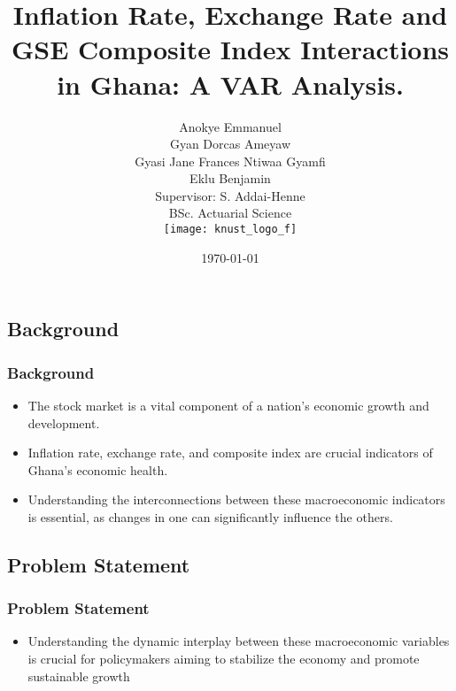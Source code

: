 \documentclass[12pt]{beamer}
\title[ KNUST]{\textbf{\small{Inflation Rate, Exchange Rate and GSE Composite Index Interactions in Ghana: A VAR Analysis.}}}
\author[BSc. Actuarial Science]{{\footnotesize{Anokye Emmanuel\\Gyan Dorcas Ameyaw \\ Gyasi Jane Frances Ntiwaa Gyamfi\\ Eklu Benjamin\\ \vspace{0.2cm}Supervisor: S. Addai-Henne }}\vspace{0.2cm} \\ BSc. Actuarial Science\\[5mm] \texttt{[image: knust\_logo\_f]}}
\institute[COS]{ Kwame Nkrumah University Of Science And Technology, KNUST \\ Kumasi, Ghana}
\date[\tiny \today]{\scriptsize \today}
\begin{document}

	\begin{frame}[plain]
		\maketitle
	\end{frame}
	
	
	

	\begin{frame}
		\section{Background} 
		\frametitle{Background}
		\begin{flushleft}
				\begin{itemize}
		
				
		
\item The stock market is a vital component of a nation's economic growth and development.
\vspace{0.3cm}
\item Inflation rate, exchange rate, and composite index are crucial indicators of Ghana's economic health.
\vspace{0.3cm}
\item Understanding the interconnections between these macroeconomic indicators is essential, as changes in one can significantly influence the others.
	\end{itemize}
		\end{flushleft}	
	\end{frame}

	
	\begin{frame}
		\section{Problem Statement} 
	\frametitle{Problem Statement}

	


		\begin{itemize}
	\item Understanding the dynamic interplay between these macroeconomic variables is crucial for policymakers aiming to stabilize the economy and promote sustainable growth\cite{kyereboah2008} 
	

	\end{itemize}	
 \end{frame}		
\end{document}
